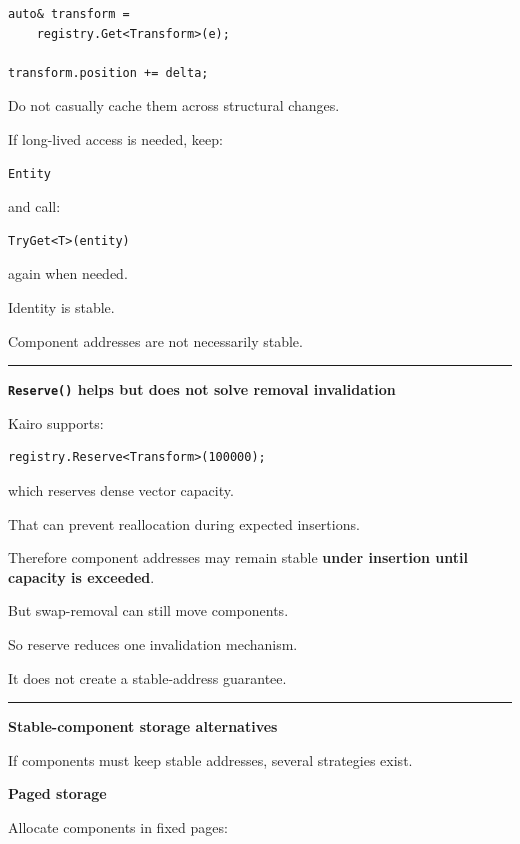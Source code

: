 \begin{verbatim}
auto& transform =
    registry.Get<Transform>(e);

transform.position += delta;
\end{verbatim}

Do not casually cache them across structural changes.

If long-lived access is needed, keep:

\begin{verbatim}
Entity
\end{verbatim}

and call:

\begin{verbatim}
TryGet<T>(entity)
\end{verbatim}

again when needed.

Identity is stable.

Component addresses are not necessarily stable.

\begin{center}\rule{0.5\linewidth}{0.5pt}\end{center}

\textbf{\texttt{Reserve()} helps but does not solve removal invalidation}

Kairo supports:

\begin{verbatim}
registry.Reserve<Transform>(100000);
\end{verbatim}

which reserves dense vector capacity.

That can prevent reallocation during expected insertions.

Therefore component addresses may remain stable \textbf{under insertion until capacity is exceeded}.

But swap-removal can still move components.

So reserve reduces one invalidation mechanism.

It does not create a stable-address guarantee.

\begin{center}\rule{0.5\linewidth}{0.5pt}\end{center}

\textbf{Stable-component storage alternatives}

If components must keep stable addresses, several strategies exist.

\textbf{Paged storage}

Allocate components in fixed pages:

